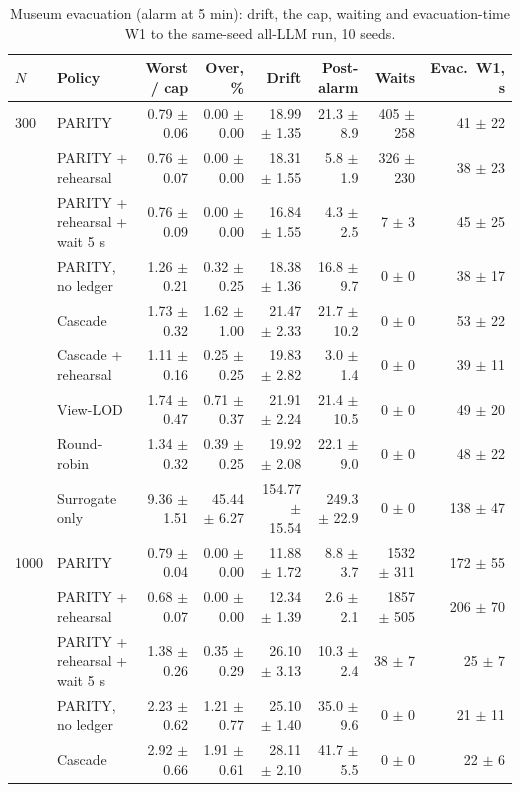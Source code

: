 \begin{table}[t]
\centering
\caption{Museum evacuation (alarm at 5 min): drift, the cap, waiting and evacuation-time W1 to the same-seed all-LLM run, 10 seeds.}
\label{tab:museum}
\begin{tabular}{llrrrrrr}
\toprule
$N$ & Policy & Worst / cap & Over, \% & Drift & Post-alarm & Waits & Evac.\ W1, s \\
\midrule
300 & PARITY & 0.79 $\pm$ 0.06 & 0.00 $\pm$ 0.00 & 18.99 $\pm$ 1.35 & 21.3 $\pm$ 8.9 & 405 $\pm$ 258 & 41 $\pm$ 22 \\
 & PARITY + rehearsal & 0.76 $\pm$ 0.07 & 0.00 $\pm$ 0.00 & 18.31 $\pm$ 1.55 & 5.8 $\pm$ 1.9 & 326 $\pm$ 230 & 38 $\pm$ 23 \\
 & PARITY + rehearsal + wait 5 s & 0.76 $\pm$ 0.09 & 0.00 $\pm$ 0.00 & 16.84 $\pm$ 1.55 & 4.3 $\pm$ 2.5 & 7 $\pm$ 3 & 45 $\pm$ 25 \\
 & PARITY, no ledger & 1.26 $\pm$ 0.21 & 0.32 $\pm$ 0.25 & 18.38 $\pm$ 1.36 & 16.8 $\pm$ 9.7 & 0 $\pm$ 0 & 38 $\pm$ 17 \\
 & Cascade & 1.73 $\pm$ 0.32 & 1.62 $\pm$ 1.00 & 21.47 $\pm$ 2.33 & 21.7 $\pm$ 10.2 & 0 $\pm$ 0 & 53 $\pm$ 22 \\
 & Cascade + rehearsal & 1.11 $\pm$ 0.16 & 0.25 $\pm$ 0.25 & 19.83 $\pm$ 2.82 & 3.0 $\pm$ 1.4 & 0 $\pm$ 0 & 39 $\pm$ 11 \\
 & View-LOD & 1.74 $\pm$ 0.47 & 0.71 $\pm$ 0.37 & 21.91 $\pm$ 2.24 & 21.4 $\pm$ 10.5 & 0 $\pm$ 0 & 49 $\pm$ 20 \\
 & Round-robin & 1.34 $\pm$ 0.32 & 0.39 $\pm$ 0.25 & 19.92 $\pm$ 2.08 & 22.1 $\pm$ 9.0 & 0 $\pm$ 0 & 48 $\pm$ 22 \\
 & Surrogate only & 9.36 $\pm$ 1.51 & 45.44 $\pm$ 6.27 & 154.77 $\pm$ 15.54 & 249.3 $\pm$ 22.9 & 0 $\pm$ 0 & 138 $\pm$ 47 \\
\midrule
1000 & PARITY & 0.79 $\pm$ 0.04 & 0.00 $\pm$ 0.00 & 11.88 $\pm$ 1.72 & 8.8 $\pm$ 3.7 & 1532 $\pm$ 311 & 172 $\pm$ 55 \\
 & PARITY + rehearsal & 0.68 $\pm$ 0.07 & 0.00 $\pm$ 0.00 & 12.34 $\pm$ 1.39 & 2.6 $\pm$ 2.1 & 1857 $\pm$ 505 & 206 $\pm$ 70 \\
 & PARITY + rehearsal + wait 5 s & 1.38 $\pm$ 0.26 & 0.35 $\pm$ 0.29 & 26.10 $\pm$ 3.13 & 10.3 $\pm$ 2.4 & 38 $\pm$ 7 & 25 $\pm$ 7 \\
 & PARITY, no ledger & 2.23 $\pm$ 0.62 & 1.21 $\pm$ 0.77 & 25.10 $\pm$ 1.40 & 35.0 $\pm$ 9.6 & 0 $\pm$ 0 & 21 $\pm$ 11 \\
 & Cascade & 2.92 $\pm$ 0.66 & 1.91 $\pm$ 0.61 & 28.11 $\pm$ 2.10 & 41.7 $\pm$ 5.5 & 0 $\pm$ 0 & 22 $\pm$ 6 \\

\end{tabular}
\end{table}
